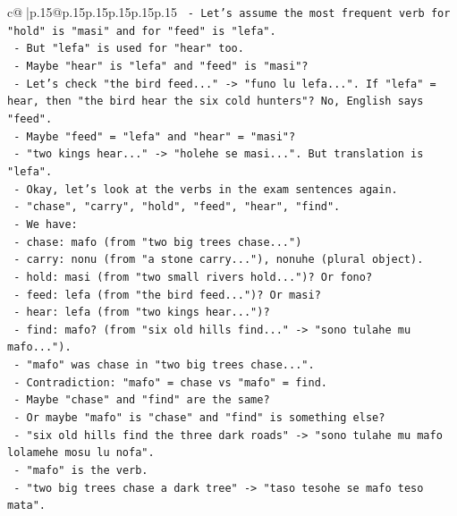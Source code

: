 \documentclass{article}
\begin{document}
{\begin{supertabular}{c@{$\;$}|p{.15\linewidth}@{}p{.15\linewidth}p{.15\linewidth}p{.15\linewidth}p{.15\linewidth}p{.15\linewidth}}
{{{\texttt{        {-} Let's assume the most frequent verb for "hold" is "masi" and for "feed" is "lefa".} \\
\texttt{        {-} But "lefa" is used for "hear" too.} \\
\texttt{        {-} Maybe "hear" is "lefa" and "feed" is "masi"?} \\
\texttt{        {-} Let's check "the bird feed..." {-}> "funo lu lefa...". If "lefa" = hear, then "the bird hear the six cold hunters"? No, English says "feed".} \\
\texttt{        {-} Maybe "feed" = "lefa" and "hear" = "masi"?} \\
\texttt{        {-} "two kings hear..." {-}> "holehe se masi...". But translation is "lefa".} \\
\texttt{        {-} Okay, let's look at the verbs in the exam sentences again.} \\
\texttt{        {-} "chase", "carry", "hold", "feed", "hear", "find".} \\
\texttt{        {-} We have:} \\
\texttt{          {-} chase: mafo (from "two big trees chase...")} \\
\texttt{          {-} carry: nonu (from "a stone carry..."), nonuhe (plural object).} \\
\texttt{          {-} hold: masi (from "two small rivers hold...")? Or fono?} \\
\texttt{          {-} feed: lefa (from "the bird feed...")? Or masi?} \\
\texttt{          {-} hear: lefa (from "two kings hear...")?} \\
\texttt{          {-} find: mafo? (from "six old hills find..." {-}> "sono tulahe mu mafo...").} \\
\texttt{          {-} "mafo" was chase in "two big trees chase...".} \\
\texttt{          {-} Contradiction: "mafo" = chase vs "mafo" = find.} \\
\texttt{          {-} Maybe "chase" and "find" are the same?} \\
\texttt{          {-} Or maybe "mafo" is "chase" and "find" is something else?} \\
\texttt{          {-} "six old hills find the three dark roads" {-}> "sono tulahe mu mafo lolamehe mosu lu nofa".} \\
\texttt{          {-} "mafo" is the verb.} \\
\texttt{          {-} "two big trees chase a dark tree" {-}> "taso tesohe se mafo teso mata".} \\
}}}
\end{supertabular}}
\end{document}
